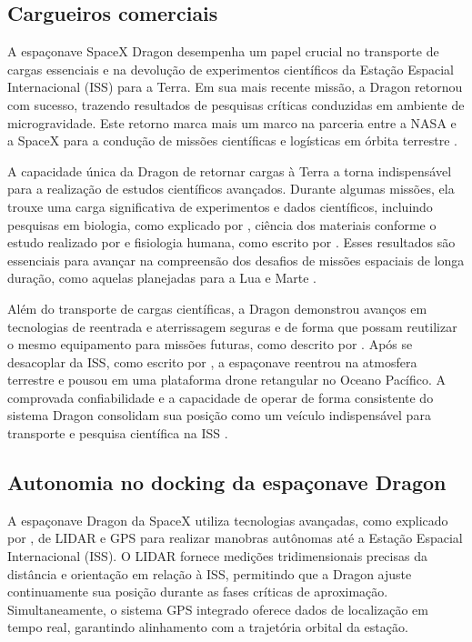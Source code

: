 \subsection{Cargueiros comerciais}

A espaçonave SpaceX Dragon desempenha um papel crucial no transporte de cargas essenciais e na devolução de experimentos científicos da Estação Espacial Internacional (ISS) para a Terra. Em sua mais recente missão, a Dragon retornou com sucesso, trazendo resultados de pesquisas críticas conduzidas em ambiente de microgravidade. Este retorno marca mais um marco na parceria entre a NASA e a SpaceX para a condução de missões científicas e logísticas em órbita terrestre \citep{nasaDragonReturn}.

A capacidade única da Dragon de retornar cargas à Terra a torna indispensável para a realização de estudos científicos avançados. Durante algumas missões, ela trouxe uma carga significativa de experimentos e dados científicos, incluindo pesquisas em biologia, como explicado por \citep{bell2018}, ciência dos materiais conforme o estudo realizado por \citep{chamberlain2021} e fisiologia humana, como escrito por \citep{wang2018}. Esses resultados são essenciais para avançar na compreensão dos desafios de missões espaciais de longa duração, como aquelas planejadas para a Lua e Marte \citep{nasaDragonReturn}.

Além do transporte de cargas científicas, a Dragon demonstrou avanços em tecnologias de reentrada e aterrissagem seguras e de forma que possam reutilizar o mesmo equipamento para missões futuras, como descrito por \citep{nasaFalcon9Dragon}. Após se desacoplar da ISS, como escrito por \citep{nasaspaceflightDroneShip}, a espaçonave reentrou na atmosfera terrestre e pousou em uma plataforma drone retangular no Oceano Pacífico. A comprovada confiabilidade e a capacidade de operar de forma consistente do sistema Dragon consolidam sua posição como um veículo indispensável para transporte e pesquisa científica na ISS \citep{nasaDragonReturn}.

\subsection{Autonomia no docking da espaçonave Dragon}

A espaçonave Dragon da SpaceX utiliza tecnologias avançadas, como explicado por \citep{nasaspaceflightDragonISS}, de LIDAR e GPS para realizar manobras autônomas até a Estação Espacial Internacional (ISS). O LIDAR fornece medições tridimensionais precisas da distância e orientação em relação à ISS, permitindo que a Dragon ajuste continuamente sua posição durante as fases críticas de aproximação. Simultaneamente, o sistema GPS integrado oferece dados de localização em tempo real, garantindo alinhamento com a trajetória orbital da estação.

